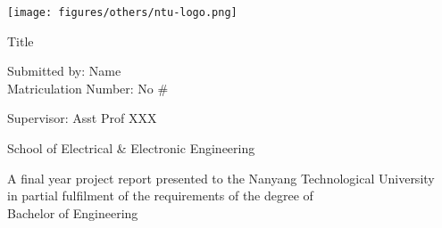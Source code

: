 \documentclass[a4paper,12pt]{article}
\begin{document}
\begin{titlepage}
  \begin{center}
    \texttt{[image: figures/others/ntu-logo.png]}
    \\[1.7cm]
    {\selectfont
    \begin{spacing}{1.2}
    {\LARGE  Title
    \\[2.5cm] %
    }
    \end{spacing}
    \noindent
    \noindent
    \Large Submitted by: Name\\
    \Large Matriculation Number: No #

    \vspace{\baselineskip}
    \Large Supervisor: Asst Prof XXX\\[1.5cm]

    }
    {\selectfont
    {\Large School of Electrical \& Electronic Engineering \\[1.5cm]}
    \begin{spacing}{1}
    \small A final year project report presented to the Nanyang Technological University \\
    in partial fulfilment of the requirements of the degree of \\
    Bachelor of Engineering \\[0.5cm]
    \end{spacing}
    }
    {}
  \end{center}
\end{titlepage}

\setmainfont{Times New Roman}











\newpage
{}
\printbibliography
\label{references}



\end{document}
